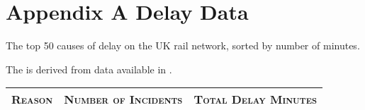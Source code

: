 
\chapter{Appendix A Delay Data}
\label{app:delaydata}
The top 50 causes of delay on the UK rail network, sorted by number of minutes.

The is derived from data available in \citep{NetworkRailInfrastructureLtd2017}.


\begin{landscape}

\begin{longtabu} to \linewidth {|X[1 , p ] |X[0.4 , c ] | X[0.4 , c ]}\firsthline\hline
\textsc{Reason}  &\textsc{Number of Incidents} & \textsc{Total Delay Minutes} \\ \hline
%
\endhead



\end{longtabu}
\end{landscape}
